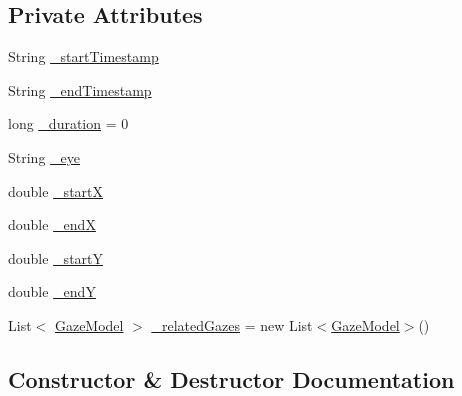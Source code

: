 \subsection*{Private Attributes}
\begin{DoxyCompactItemize}
\item 
String \hyperlink{class_web_analyzer_1_1_models_1_1_analysis_model_1_1_fixation_model_a91602e50b7f2a77eaaae995b5f605d5e}{\+\_\+start\+Timestamp}
\item 
String \hyperlink{class_web_analyzer_1_1_models_1_1_analysis_model_1_1_fixation_model_ab06c88b23bfd1ab3974e50cb7028eac5}{\+\_\+end\+Timestamp}
\item 
long \hyperlink{class_web_analyzer_1_1_models_1_1_analysis_model_1_1_fixation_model_a237ba81a634b4460d754da0a8cafb2ef}{\+\_\+duration} = 0
\item 
String \hyperlink{class_web_analyzer_1_1_models_1_1_analysis_model_1_1_fixation_model_a88b40bce62fdbc793553ec4f6926b758}{\+\_\+eye}
\item 
double \hyperlink{class_web_analyzer_1_1_models_1_1_analysis_model_1_1_fixation_model_aae6ca5737e71e087a0adc04a748b3d4a}{\+\_\+start\+X}
\item 
double \hyperlink{class_web_analyzer_1_1_models_1_1_analysis_model_1_1_fixation_model_a7e2e27ddcd00e7cf48253e9a37faf180}{\+\_\+end\+X}
\item 
double \hyperlink{class_web_analyzer_1_1_models_1_1_analysis_model_1_1_fixation_model_aba4f10b5ecaf1bef32a74d00c569ec79}{\+\_\+start\+Y}
\item 
double \hyperlink{class_web_analyzer_1_1_models_1_1_analysis_model_1_1_fixation_model_a3925ac88fde0915d24f5c3c9ae62e535}{\+\_\+end\+Y}
\item 
List$<$ \hyperlink{class_web_analyzer_1_1_models_1_1_data_model_1_1_gaze_model}{Gaze\+Model} $>$ \hyperlink{class_web_analyzer_1_1_models_1_1_analysis_model_1_1_fixation_model_a9ccd1c97cb1da60a5402db3d63e18150}{\+\_\+related\+Gazes} = new List$<$\hyperlink{class_web_analyzer_1_1_models_1_1_data_model_1_1_gaze_model}{Gaze\+Model}$>$()
\end{DoxyCompactItemize}


\subsection{Constructor \& Destructor Documentation}
\hypertarget{class_web_analyzer_1_1_models_1_1_analysis_model_1_1_fixation_model_a462b5af1ba7cf2fd227cd570ced6a654}{}
